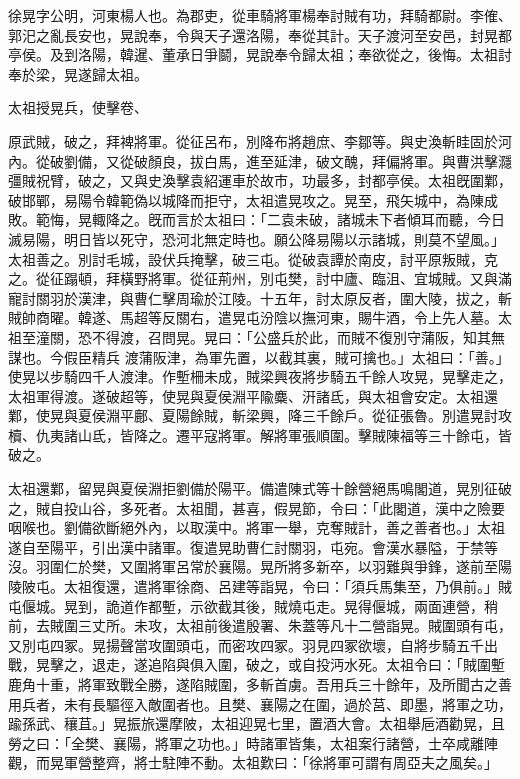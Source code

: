 \begin{pinyinscope}
 
 
 徐晃字公明，河東楊人也。為郡吏，從車騎將軍楊奉討賊有功，拜騎都尉。李傕、郭汜之亂長安也，晃說奉，令與天子還洛陽，奉從其計。天子渡河至安邑，封晃都亭侯。及到洛陽，韓暹、董承日爭鬬，晃說奉令歸太祖；奉欲從之，後悔。太祖討奉於梁，晃遂歸太祖。
 
 
 
 
 太祖授晃兵，使擊卷、
 
 
 原武賊，破之，拜裨將軍。從征呂布，別降布將趙庶、李鄒等。與史渙斬眭固於河內。從破劉備，又從破顏良，拔白馬，進至延津，破文醜，拜偏將軍。與曹洪擊㶏彊賊祝臂，破之，又與史渙擊袁紹運車於故市，功最多，封都亭侯。太祖旣圍鄴，破邯鄲，易陽令韓範偽以城降而拒守，太祖遣晃攻之。晃至，飛矢城中，為陳成敗。範悔，晃輙降之。旣而言於太祖曰：「二袁未破，諸城未下者傾耳而聽，今日滅易陽，明日皆以死守，恐河北無定時也。願公降易陽以示諸城，則莫不望風。」太祖善之。別討毛城，設伏兵掩擊，破三屯。從破袁譚於南皮，討平原叛賊，克之。從征蹋頓，拜橫野將軍。從征荊州，別屯樊，討中廬、臨沮、宜城賊。又與滿寵討關羽於漢津，與曹仁擊周瑜於江陵。十五年，討太原反者，圍大陵，拔之，斬賊帥商曜。韓遂、馬超等反關右，遣晃屯汾陰以撫河東，賜牛酒，令上先人墓。太祖至潼關，恐不得渡，召問晃。晃曰：「公盛兵於此，而賊不復別守蒲阪，知其無謀也。今假臣精兵
 渡蒲阪津，為軍先置，以截其裏，賊可擒也。」太祖曰：「善。」使晃以步騎四千人渡津。作塹柵未成，賊梁興夜將步騎五千餘人攻晃，晃擊走之，太祖軍得渡。遂破超等，使晃與夏侯淵平隃麋、汧諸氐，與太祖會安定。太祖還鄴，使晃與夏侯淵平鄜、夏陽餘賊，斬梁興，降三千餘戶。從征張魯。別遣晃討攻櫝、仇夷諸山氐，皆降之。遷平寇將軍。解將軍張順圍。擊賊陳福等三十餘屯，皆破之。
 
 
 
 
 太祖還鄴，留晃與夏侯淵拒劉備於陽平。備遣陳式等十餘營絕馬鳴閣道，晃別征破之，賊自投山谷，多死者。太祖聞，甚喜，假晃節，令曰：「此閣道，漢中之險要咽喉也。劉備欲斷絕外內，以取漢中。將軍一舉，克奪賊計，善之善者也。」太祖遂自至陽平，引出漢中諸軍。復遣晃助曹仁討關羽，屯宛。會漢水暴隘，于禁等沒。羽圍仁於樊，又圍將軍呂常於襄陽。晃所將多新卒，以羽難與爭鋒，遂前至陽陵陂屯。太祖復還，遣將軍徐商、呂建等詣晃，令曰：「須兵馬集至，乃俱前。」賊屯偃城。晃到，詭道作都塹，示欲截其後，賊燒屯走。晃得偃城，兩面連營，稍前，去賊圍三丈所。未攻，太祖前後遣殷署、朱蓋等凡十二營詣晃。賊圍頭有屯，又別屯四冢。晃揚聲當攻圍頭屯，而密攻四冢。羽見四冢欲壞，自將步騎五千出戰，晃擊之，退走，遂追陷與俱入圍，破之，或自投沔水死。太祖令曰：「賊圍塹鹿角十重，將軍致戰全勝，遂陷賊圍，多斬首虜。吾用兵三十餘年，及所聞古之善用兵者，未有長驅徑入敵圍者也。且樊、襄陽之在圍，過於莒、即墨，將軍之功，踰孫武、穰苴。」晃振旅還摩陂，太祖迎晃七里，置酒大會。太祖舉巵酒勸晃，且勞之曰：「全樊、襄陽，將軍之功也。」時諸軍皆集，太祖案行諸營，士卒咸離陣觀，而晃軍營整齊，將士駐陣不動。太祖歎曰：「徐將軍可謂有周亞夫之風矣。」
 

\end{pinyinscope}
